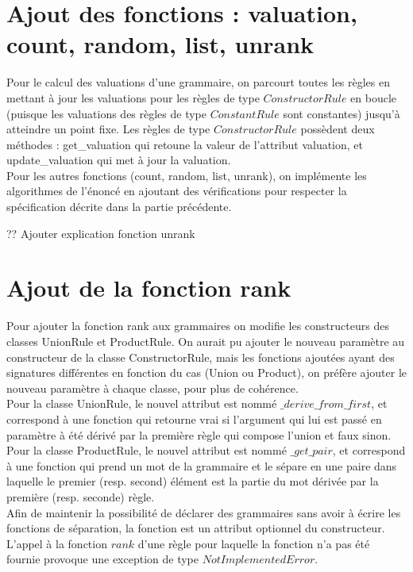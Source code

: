 \documentclass[a4paper, titlepage]{article}
\begin{document}
\section {Ajout des fonctions : valuation, count, random, list,  unrank}

Pour le calcul des valuations d'une grammaire, on parcourt toutes les
règles en mettant à jour les valuations pour les règles de type
$ConstructorRule$ en boucle (puisque les valuations des règles de type
$ConstantRule$ sont constantes) jusqu'à atteindre un point fixe.
Les règles de type $ConstructorRule$ possèdent deux méthodes :
get\_valuation qui retoune la valeur de l'attribut valuation, et
update\_valuation qui met à jour la valuation. \\

Pour les autres fonctions (count, random, list, unrank), on implémente
les algorithmes de l'énoncé en ajoutant des vérifications pour
respecter la spécification décrite dans la partie précédente.

?? Ajouter explication fonction unrank

\section {Ajout de la fonction rank}

Pour ajouter la fonction rank aux grammaires on modifie les
constructeurs des classes UnionRule et ProductRule.
On aurait pu ajouter le nouveau paramètre au constructeur de la
classe ConstructorRule, mais les fonctions ajoutées ayant des
signatures différentes en fonction du cas (Union ou Product), on
préfère ajouter le nouveau paramètre à chaque classe, pour plus de
cohérence.\\


Pour la classe UnionRule, le nouvel attribut est nommé
$\_derive\_from\_first$, et correspond à une fonction qui retourne
vrai si l'argument qui lui est passé en paramètre à été dérivé par la
première règle qui compose l'union et faux sinon.\\


Pour la classe ProductRule, le nouvel attribut est nommé
$\_get\_pair$, et correspond à une fonction qui prend un mot de la
grammaire et le sépare en une paire dans laquelle le premier (resp. second) élément
est la partie du mot dérivée par la première (resp. seconde) règle.\\


Afin de maintenir la possibilité de déclarer des grammaires sans avoir
à écrire les fonctions de séparation, la fonction est un attribut
optionnel du constructeur. L'appel à la fonction $rank$ d'une règle
pour laquelle la fonction n'a pas été fournie provoque une exception
de type $NotImplementedError$. \\
\end{document}
